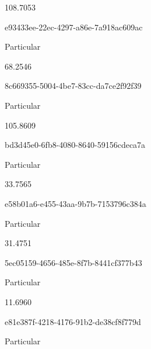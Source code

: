 \documentclass[
  11pt,
  a4paper,
  DIV=11,
  numbers=noendperiod]{scrartcl}
\begin{document}
\n      

108.7053

\n    

\n    

\n      

e93433ee-22ec-4297-a86e-7a918ac609ac

\n      

Particular

\n      

68.2546

\n    

\n    

\n      

8c669355-5004-4be7-83cc-da7ce2f92f39

\n      

Particular

\n      

105.8609

\n    

\n    

\n      

bd3d45e0-6fb8-4080-8640-59156cdeca7a

\n      

Particular

\n      

33.7565

\n    

\n    

\n      

e58b01a6-e455-43aa-9b7b-7153796c384a

\n      

Particular

\n      

31.4751

\n    

\n    

\n      

5ec05159-4656-485e-8f7b-8441cf377b43

\n      

Particular

\n      

11.6960

\n    

\n    

\n      

e81e387f-4218-4176-91b2-de38cf8f779d

\n      

Particular

\n      
\end{document}
